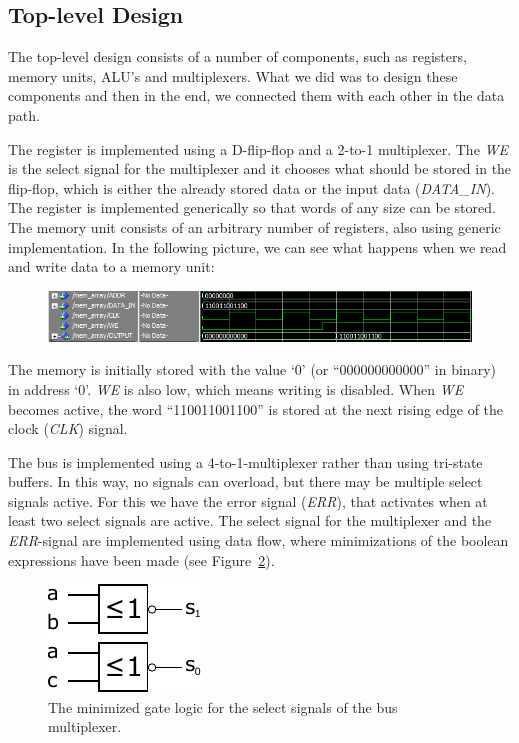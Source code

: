 \documentclass[a4,11pt]{article}
\begin{document}
\newpage

\subsection{Top-level Design}

The top-level design consists of a number of components, such as registers, memory units, ALU's
and multiplexers. What we did was to design these components and then in the end, we connected
them with each other in the data path.

The register is implemented using a D-flip-flop and a 2-to-1 multiplexer. The {\it WE} is the select
signal for the multiplexer and it chooses what should be stored in the flip-flop, which is either
the already stored data or the input data ({\it DATA\_IN}). The register is implemented
generically so that words of any size can be stored. The memory unit consists of an arbitrary number
of registers, also using generic implementation. In the following picture, we can see what happens
when we read and write data to a memory unit:

\begin{figure}[h!]
	\centering
	\includegraphics[width=1\textwidth]{Figurer/data_memory.PNG}
	\label{fig:sim}
\end{figure}

The memory is initially stored with the value `0' (or ``000000000000'' in binary) in address `0'.
{\it WE} is also low, which means writing is disabled. When {\it WE} becomes active, the word
``110011001100'' is stored at the next rising edge of the clock ({\it CLK}) signal.

The bus is implemented using a 4-to-1-multiplexer rather than using tri-state buffers. In this
way, no signals can overload, but there may be multiple select signals active. For this we have
the error signal ({\it ERR}), that activates when at least two select signals are active. The
select signal for the multiplexer and the {\it ERR}-signal are implemented using data flow, where
minimizations of the boolean expressions have been made (see Figure~\ref{fig:enc}).

\begin{figure}[h!]
	\centering
	\includegraphics[width=.3\textwidth]{Figurer/enc4b}
	\caption{The minimized gate logic for the select signals of the bus multiplexer.}
	\label{fig:enc}
\end{figure}
\end{document}
